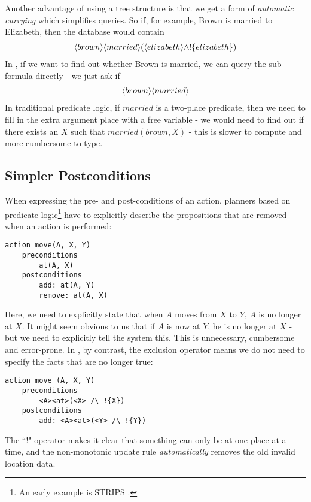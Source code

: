 Another advantage of using a tree structure is that we get a form of \emph{automatic currying} which simplifies queries.
So if, for example, Brown is married to Elizabeth, then the database would contain 
\begin{eqnarray*}
\langle brown \rangle \langle married \rangle (\langle elizabeth \rangle \land ! \{elizabeth\})
\end{eqnarray*}
In \ELFULL{}, if we want to find out whether Brown is married, we can query the sub-formula directly -  we just ask if 
\begin{eqnarray*}
\langle brown \rangle \langle married \rangle \end{eqnarray*}
In traditional predicate logic, if $married$ is a two-place predicate, then we need to fill in the extra argument place with a free variable - we would need to find out if there exists an $X$ such that $married(brown, X)$ - this is slower to compute and more cumbersome to type. 

\subsection{Simpler Postconditions}

When expressing the pre- and post-conditions of an action, planners
based on predicate logic\footnote{An early example is STRIPS
  \cite{strips}.} have to explicitly describe the propositions that
are removed when an action is performed:
\begin{verbatim}
action move(A, X, Y)
    preconditions
        at(A, X)
    postconditions
        add: at(A, Y) 
        remove: at(A, X)
\end{verbatim}
Here, we need to explicitly state that when $A$ moves from $X$ to $Y$, $A$ is no longer at $X$. It might seem obvious to us that if $A$ is now at $Y$, he is no longer at $X$ - but we need to explicitly tell the system this. This is unnecessary, cumbersome and error-prone. In \ELFULL{}, by contrast, the exclusion operator means we do not need to specify the facts that are no longer true:
\begin{verbatim}
action move (A, X, Y)
    preconditions
        <A><at>(<X> /\ !{X})
    postconditions
        add: <A><at>(<Y> /\ !{Y})
\end{verbatim}
The ``!" operator makes it clear that something can only be at one
place at a time, and the non-monotonic update rule
\emph{automatically} removes the old invalid location data.

